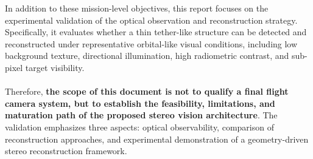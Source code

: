 In addition to these mission-level objectives, this report focuses on the experimental validation of the optical observation and reconstruction strategy. Specifically, it evaluates whether a thin tether-like structure can be detected and reconstructed under representative orbital-like visual conditions, including low background texture, directional illumination, high radiometric contrast, and sub-pixel target visibility.
\\\\
Therefore, \textbf{the scope of this document is not to qualify a final flight camera system, but to establish the feasibility, limitations, and maturation path of the proposed stereo vision architecture}. The validation emphasizes three aspects: optical observability, comparison of reconstruction approaches, and experimental demonstration of a geometry-driven stereo reconstruction framework.
